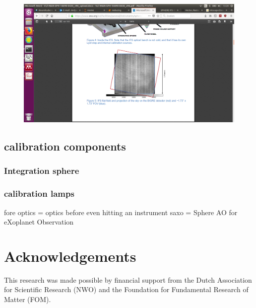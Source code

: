 \documentclass[twoside,single]{lion-msc}
\begin{document}
\begin{figure}[htbp]
\centering 
\includegraphics[trim={15cm 5.5cm 10cm 9.5cm},clip,scale = 0.47]{biggre}
\caption{} 
\label{}
\end{figure}

\subsection{calibration components}
\subsubsection{Integration sphere}
\subsubsection{calibration lamps}

fore optics = optics before even hitting an instrument
saxo = Sphere AO for eXoplanet Observation





%

\appendix


\section*{Acknowledgements}
This research was made possible by financial support from the Dutch Association for Scientific Research (NWO) and the Foundation for Fundamental Research of Matter (FOM).



\end{document}

